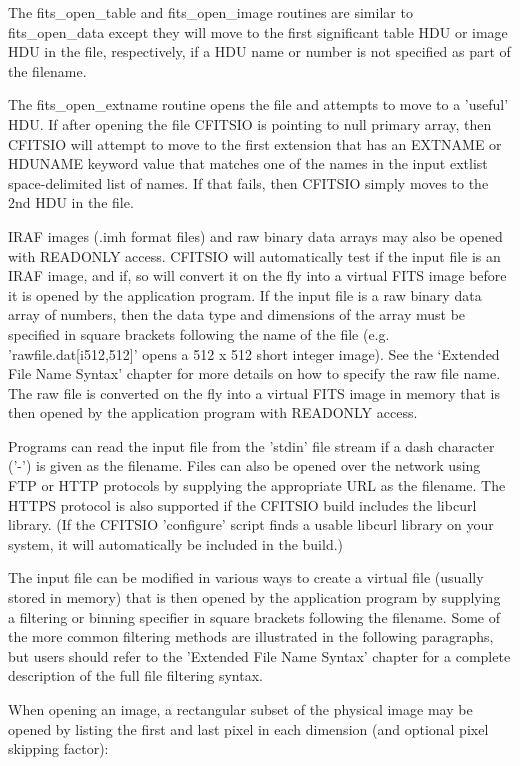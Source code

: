 \documentclass[11pt]{book}
\begin{document}
\begin{description}
The fits\_open\_table and fits\_open\_image routines are similar to
fits\_open\_data except they will move to the first significant table
HDU or image HDU in the file, respectively, if a HDU name or
number is not specified as part of the filename.

The fits\_open\_extname routine opens the file and attempts to move to a 'useful'
HDU. If after opening the file CFITSIO is pointing to null primary array,
then CFITSIO will attempt to move to the first extension that has an EXTNAME or
HDUNAME keyword value that matches one of the names in the input extlist
space-delimited list of names.  If that fails, then CFITSIO simply moves to the
2nd HDU in the file.

IRAF images (.imh format files) and raw binary data arrays may also be
opened with READONLY access.  CFITSIO will automatically test if the
input file is an IRAF image, and if, so will convert it on the fly into
a virtual FITS image before it is opened by the application program.
If the input file is a raw binary data array of numbers, then the data type
and dimensions of the array must be specified in square brackets
following the name of the file (e.g.  'rawfile.dat[i512,512]' opens a
512 x 512 short integer image).  See the `Extended File Name Syntax'
chapter for more details on how to specify the raw file name.  The raw
file is converted on the fly into a virtual FITS image in memory that
is then opened by the application program with READONLY access.

Programs can read the input file from the 'stdin' file stream if a dash
character ('-') is given as the filename. Files can also be opened over
the network using FTP or HTTP protocols by supplying the appropriate URL
as the filename.  The HTTPS protocol is also supported if the CFITSIO
build includes the libcurl library.  (If the CFITSIO 'configure' script
finds a usable libcurl library on your system, it will automatically be 
included in the build.)

The input file can be modified in various ways to create a virtual file
(usually stored in memory) that is then opened by the application
program by supplying a filtering or binning specifier in square brackets
following the filename. Some of the more common filtering methods are
illustrated in the following paragraphs, but users should refer to the
'Extended File Name Syntax' chapter for a complete description of
the full file filtering syntax.

When opening an image, a rectangular subset of the physical image may be
opened by listing the first and last pixel in each dimension (and
optional pixel skipping factor):


\end{description}
\end{document}
